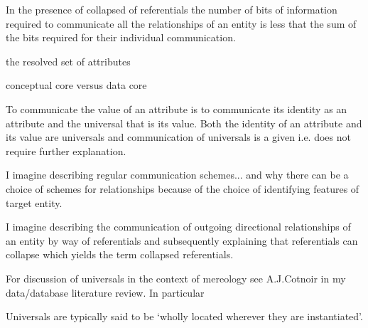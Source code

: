\mynote In the presence of collapsed of referentials the number of bits of information required to communicate all the relationships of an entity is less that the sum of the bits required for their individual communication. 

\mynote the resolved set of attributes

\mynote conceptual core versus data core


\begin{oldtt}
\mynote To communicate the value of an attribute is to communicate its identity as an attribute and the universal that is its value. Both the identity of an attribute and its value are universals and communication of universals is a given i.e. does not require further explanation. 
\end{oldtt}



\begin{noteforfuture}
I imagine describing regular communication schemes... and why there can be a choice of schemes for relationships because of the choice of identifying features of target entity. 
\end{noteforfuture}
\begin{noteforfuture}
I imagine describing the communication of outgoing directional relationships of an entity by way of referentials and subsequently explaining that referentials can collapse which yields the term collapsed referentials.
\end{noteforfuture}
\begin{noteforfuture}
For discussion of universals in  the context of mereology see A.J.Cotnoir in my data/database literature review. In particular
\begin{erquote}
Universals are typically said to be ‘wholly located wherever they are instantiated’.
\end{erquote}
\end{noteforfuture}



 
